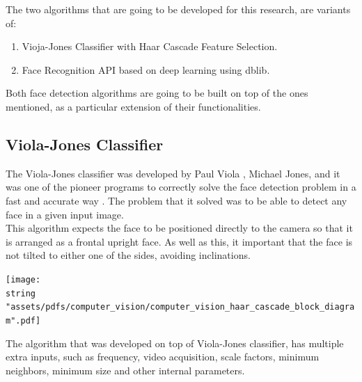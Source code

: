 \documentclass[11pt]{report} %
\begin{document}
The two algorithms that are going to be developed for this research, are variants of:

\begin{enumerate}
    \item Vioja-Jones Classifier with Haar Cascade Feature Selection.
    \item Face Recognition API based on deep learning using dblib.
\end{enumerate}

Both face detection algorithms are going to be built on top of the ones mentioned, as a particular extension of their functionalities.\\

\subsection{Viola-Jones Classifier}
\label{sec:viola_jones_classifier}

The Viola-Jones classifier was developed by Paul Viola , Michael Jones, and it was one of the pioneer programs to correctly solve the face detection problem in a fast and accurate way \citep{cite_viola_jones_face_detection_algorithm}. The problem that it solved was to be able to detect any face in a given input image.\\

This algorithm expects the face to be positioned directly to the camera so that it is arranged as a frontal upright face. As well as this, it important that the face is not tilted to either one of the sides, avoiding inclinations.\\

\begin{center}
\texttt{[image: \\string "assets/pdfs/computer\_vision/computer\_vision\_haar\_cascade\_block\_diagram".pdf]}
\bigbreak
\begin{minipage}{\linewidth} %
\label{fig_computer_vision_block_diagram_haar_cascade}
\end{minipage} \end{center}

The algorithm that was developed on top of Viola-Jones classifier, has multiple extra inputs, such as frequency, video acquisition, scale factors, minimum neighbors, minimum size and other internal parameters.\\
\end{document}
